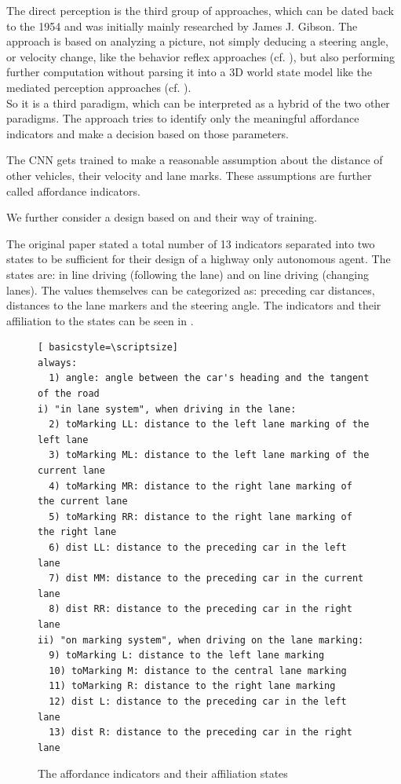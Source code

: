 The direct perception is the third group of approaches, which can be dated back to the 1954 and was initially mainly researched by James J. Gibson. \cite{gibson1954theory} The approach is based on analyzing a picture, not simply deducing a steering angle, or velocity change, like the behavior reflex approaches (cf. ), but also performing further computation without parsing it into a 3D world state model like the mediated perception approaches (cf. ). \cite{chen2015deepdriving}\\
So it is a third paradigm, which can be interpreted as a hybrid of the two other paradigms. The approach tries to identify only the meaningful affordance indicators and make a decision based on those parameters. 

The CNN gets trained to make a reasonable assumption about the distance of other vehicles, their velocity and lane marks. These assumptions are further called affordance indicators.

We further consider a design based on \cite{chen2015deepdriving} and their way of training.

The original paper \cite{chen2015deepdriving} stated a total number of 13 indicators separated into two states to be sufficient for their design of a highway only autonomous agent. The states are: in line driving (following the lane) and on line driving (changing lanes). The values themselves can be categorized as: preceding car distances, distances to the lane markers and the steering angle. The indicators and their affiliation to the states can be seen in .

\begin{figure}
\centering
\todoLine
\begin{lstlisting}[ basicstyle=\scriptsize]
always:
  1) angle: angle between the car's heading and the tangent of the road
i) "in lane system", when driving in the lane:
  2) toMarking LL: distance to the left lane marking of the left lane
  3) toMarking ML: distance to the left lane marking of the current lane
  4) toMarking MR: distance to the right lane marking of the current lane
  5) toMarking RR: distance to the right lane marking of the right lane
  6) dist LL: distance to the preceding car in the left lane
  7) dist MM: distance to the preceding car in the current lane
  8) dist RR: distance to the preceding car in the right lane
ii) "on marking system", when driving on the lane marking:
  9) toMarking L: distance to the left lane marking
  10) toMarking M: distance to the central lane marking
  11) toMarking R: distance to the right lane marking
  12) dist L: distance to the preceding car in the left lane
  13) dist R: distance to the preceding car in the right lane
\end{lstlisting}

\todoLine
\caption{The affordance indicators and their affiliation states}
\label{lst: affordance indicators}
\end{figure}

